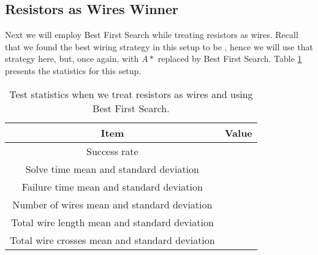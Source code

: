 \subsection{Resistors as Wires Winner}

Next we will employ Best First Search while treating resistors as wires. Recall
that we found the best wiring strategy in this setup to be \q, hence we will use
that strategy here, but, once again, with $A*$ replaced by Best First Search.
Table \ref{tb:as_wire_best_first} presents the statistics for this setup.

\begin{table}[H]
\begin{center}
\begin{singlespace}
\begin{tabular}{| c | c |}
\hline
Item & Value \\
\hline\hline
Success rate & \\
Solve time mean and standard deviation & \\
Failure time mean and standard deviation & \\
Number of wires mean and standard deviation & \\
Total wire length mean and standard deviation & \\
Total wire crosses mean and standard deviation & \\
\hline
\end{tabular}
\end{singlespace}
\end{center}
\label{tb:as_wire_best_first}
\caption{Test statistics when we treat resistors as wires and \q using Best
First Search.}
\end{table}

